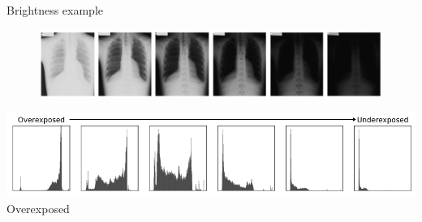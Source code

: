 \documentclass[9pt, aspectratio=169]{beamer}
\begin{document}
\begin{frame}
{Brightness example}
\centering
\begin{figure}
    \includegraphics[width=\textwidth]{xray_brightness_Veldkamp_2009.png}
    \caption{\small{\color{gray}{Same X-ray, decreasing brightness - Image from Veldkamp et al., 2009}}}
\end{figure}
\includegraphics[width=\textwidth]{xray_brightness_Veldkamp_2009_histos.png}
Overexposed
\end{frame}
\end{document}
